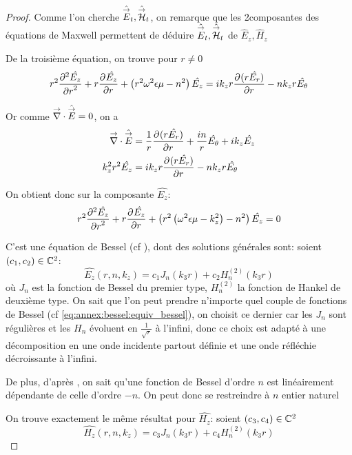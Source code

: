 \begin{proof}
    Comme l'on cherche \(\hat \vE_t, \hat \vH_t\), on remarque que les 2\ieme composantes des équations de Maxwell permettent de déduire \(\hat\vE_t, \hat\vH_t\) de \( \hat E_z, \hat H_z\)

    De la troisième  équation, on trouve pour \(r\not=0\)
    \begin{equation}
    r^2 \ddr[2]{r}{\hat{E_z}} + r\ddr{r}{\hat{E_z}} + \left(r^2\w^2\eps\mu - n^2\right)\hat{E_z} =ik_zr\ddr{r}{(r\hat{E_r})} -  nk_zr\hat{E_\theta}
    \end{equation}

    Or comme \(\vdiv \hat \vE = 0\), on a
    \begin{align}
      \vdiv\hat \vE &= \frac{1}{r}\ddr{r}{(r\hat{E_r})} + \frac{in}{r}\hat{E_\theta} + ik_z\hat{E_z}
      \\
      k_z^2r^2 \hat{E_z} &= ik_zr\ddr{r}{(r\hat{E_r})} - nk_zr\hat{E_\theta}
    \end{align}

    On obtient donc sur la composante \(\hat{E_z}\):
    \begin{equation}
      r^2 \ddr[2]{r}{\hat{E_z}} + r\ddr{r}{\hat{E_z}} + \left(r^2\left(\w^2\eps\mu - k_z^2\right) - n^2\right)\hat{E_z} = 0
    \end{equation}

    C'est une équation de Bessel (cf \cite[eq (6.80)]{bowman_introduction_1958}), dont des solutions générales sont: soient \((c_1,c_2) \in \CC^2\):
     \begin{equation}
      \hat{E_z}(r,n,k_z) = c_1 J_n\left(k_3r\right) + c_2 H_n^{(2)}\left(k_3r\right)
    \end{equation}
    où \(J_n\) est la fonction de Bessel du premier type, \(H_n^{(2)}\) la fonction de Hankel de deuxième type.
    On sait que l'on peut prendre n'importe quel couple de fonctions de Bessel (cf \eqref{eq:annex:bessel:equiv_bessel}), on choisit ce dernier car les \(J_n\) sont régulières et les \(H_n\) évoluent en \(\frac{1}{\sqrt{r}}\) à l'infini, donc ce choix est adapté à une décomposition en une onde incidente partout définie et une onde réfléchie décroissante à l'infini.

    De plus, d'après \cite[p.~358]{abramowitz_handbook_1964}, on sait qu'une fonction de Bessel d'ordre \(n\) est linéairement dépendante de celle d'ordre \(-n\).
    On peut donc se restreindre à \(n\) entier naturel

    On trouve exactement le même résultat pour \(\hat{H_z}\): soient \((c_3,c_4) \in \CC^2\)
    \begin{equation}
      \hat{H_z}(r,n,k_z) = c_3 J_n\left(k_3r\right) + c_4 H_n^{(2)}\left(k_3r\right)
    \end{equation}
  \end{proof}


